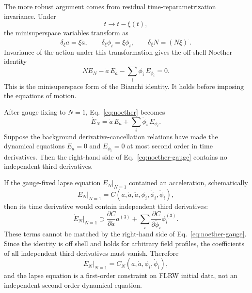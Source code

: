 \documentclass[aps,prd,twocolumn,superscriptaddress,nofootinbib,longbibliography]{revtex4-2}
\begin{document}
The more robust argument comes from residual time-reparametrization invariance.  Under
\begin{equation}
t\rightarrow t-\xi(t),
\end{equation}
the minisuperspace variables transform as
\begin{equation}
\delta_\xi a=\xi\dot a,\qquad
\delta_\xi\phi_i=\xi\dot\phi_i,\qquad
\delta_\xi N=(N\xi)^{\cdot}.
\label{eq:time-diffeo}
\end{equation}
Invariance of the action under this transformation gives the off-shell Noether identity
\begin{equation}
N\dot E_N-\dot a\,E_a-\sum_i\dot\phi_i\,E_{\phi_i}=0.
\label{eq:noether}
\end{equation}
This is the minisuperspace form of the Bianchi identity.  It holds before imposing the equations of motion.



After gauge fixing to $N=1$, Eq.~\eqref{eq:noether} becomes
\begin{equation}
\dot E_N=\dot a\,E_a+\sum_i\dot\phi_i\,E_{\phi_i}.
\label{eq:noether-gauge}
\end{equation}
Suppose the background derivative-cancellation relations have made the dynamical equations $E_a=0$ and $E_{\phi_i}=0$ at most second order in time derivatives.  Then the right-hand side of Eq.~\eqref{eq:noether-gauge} contains no independent third derivatives.

If the gauge-fixed lapse equation $E_N|_{N=1}$ contained an acceleration, schematically
\begin{equation}
E_N|_{N=1}=C(a,\dot a,\ddot a,\phi_i,\dot\phi_i,\ddot\phi_i),
\end{equation}
then its time derivative would contain independent third derivatives:
\begin{equation}
\dot E_N|_{N=1}
\supset
\frac{\partial C}{\partial \ddot a}a^{(3)}
+\sum_i
\frac{\partial C}{\partial \ddot\phi_i}\phi_i^{(3)}.
\end{equation}
These terms cannot be matched by the right-hand side of Eq.~\eqref{eq:noether-gauge}.  Since the identity is off shell and holds for arbitrary field profiles, the coefficients of all independent third derivatives must vanish.  Therefore
\begin{equation}
E_N|_{N=1}=C_N(a,\dot a,\phi_i,\dot\phi_i),
\label{eq:first-order-constraint}
\end{equation}
and the lapse equation is a first-order constraint on FLRW initial data, not an independent second-order dynamical equation.
\end{document}

